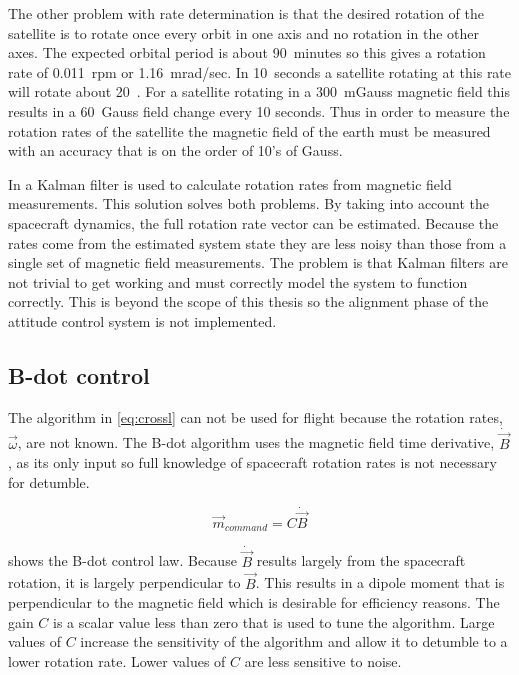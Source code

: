 The other problem with rate determination is that the desired rotation of the satellite is to rotate once every orbit in one axis and no rotation in the other axes. The expected orbital period is about 90~minutes so this gives a rotation rate of 0.011~rpm or 1.16~mrad/sec. In 10~seconds a satellite rotating at this rate will rotate about 20~\textmu\textdegree. For a satellite rotating in a 300~mGauss magnetic field this results in a 60~\textmu Gauss field change every 10 seconds. Thus in order to measure the rotation rates of the satellite the magnetic field of the earth must be measured with an accuracy that is on the order of 10's of \textmu Gauss. 

In \cite{Sturm05} a Kalman filter is used to calculate rotation rates from magnetic field measurements. This solution solves both problems. By taking into account the spacecraft dynamics, the full rotation rate vector can be estimated. Because the rates come from the estimated system state they are less noisy than those from a single set of magnetic field measurements. The problem is that Kalman filters are not trivial to get working and must correctly model the system to function correctly. This is beyond the scope of this thesis so the alignment phase of the attitude control system is not implemented.

\subsection{B-dot control}

The algorithm in \cref{eq:crossl} can not be used for flight because the rotation rates, $\vec{\omega}$, are not known. The B-dot algorithm uses the magnetic field time derivative, $\dot{\vec{B}}$, as its only input so full knowledge of spacecraft rotation rates is not necessary for detumble.

\begin{equation}
    \vec{m}_{command}= C \dot{\vec{B}}
    \label{eq:bg-bdot}
\end{equation}

 shows the B-dot control law. Because $\dot{\vec{B}}$ results largely from the spacecraft rotation, it is largely perpendicular to $\vec{B}$. This results in a dipole moment that is perpendicular to the magnetic field which is desirable for efficiency reasons. The gain $C$ is a scalar value less than zero that is used to tune the algorithm. Large values of $C$ increase the sensitivity of the algorithm and allow it to detumble to a lower rotation rate. Lower values of $C$ are less sensitive to noise. \cite{Vej10}

